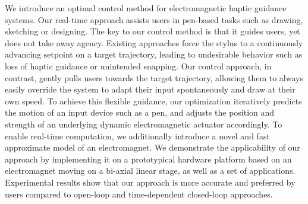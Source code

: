 We introduce an optimal control method for electromagnetic haptic guidance systems. 
Our real-time approach assists users in pen-based tasks such as drawing, sketching or designing. 
The key to our control method is that it guides users, yet does not take away agency. 
Existing approaches force the stylus to a continuously advancing setpoint on a target trajectory, leading to undesirable behavior such as loss of haptic guidance or unintended snapping. 
Our control approach, in contrast, gently pulls users towards the target trajectory, allowing them to always easily override the system to adapt their input spontaneously and draw at their own speed. 
To achieve this flexible guidance, our optimization iteratively predicts the motion of an input device such as a pen, and adjusts the position and strength of an underlying dynamic electromagnetic actuator accordingly. 
To enable real-time computation, we additionally introduce a novel and fast approximate model of an electromagnet. 
We demonstrate the applicability of our approach by implementing it on a prototypical hardware platform based on an electromagnet moving on a bi-axial linear stage, as well as a set of applications. 
Experimental results show that our approach is more accurate and preferred by users compared to open-loop and time-dependent closed-loop approaches.



